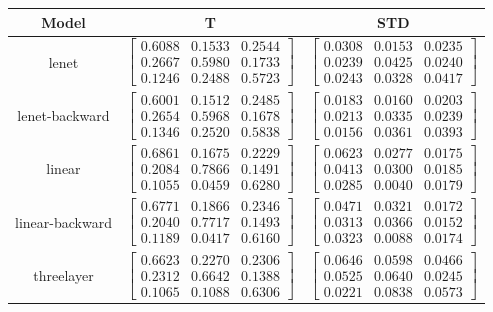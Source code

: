 \documentclass{article} %
\begin{document}
\begin{table}\begin{tabular}{ccc}Model&T&STD\\\hline
lenet & $\begin{bmatrix}0.6088 & 0.1533 & 0.2544\\0.2667 & 0.5980 & 0.1733\\0.1246 & 0.2488 & 0.5723\end{bmatrix}$ & $\begin{bmatrix}0.0308 & 0.0153 & 0.0235\\0.0239 & 0.0425 & 0.0240\\0.0243 & 0.0328 & 0.0417\end{bmatrix}$\\
lenet-backward & $\begin{bmatrix}0.6001 & 0.1512 & 0.2485\\0.2654 & 0.5968 & 0.1678\\0.1346 & 0.2520 & 0.5838\end{bmatrix}$ & $\begin{bmatrix}0.0183 & 0.0160 & 0.0203\\0.0213 & 0.0335 & 0.0239\\0.0156 & 0.0361 & 0.0393\end{bmatrix}$\\
linear & $\begin{bmatrix}0.6861 & 0.1675 & 0.2229\\0.2084 & 0.7866 & 0.1491\\0.1055 & 0.0459 & 0.6280\end{bmatrix}$ & $\begin{bmatrix}0.0623 & 0.0277 & 0.0175\\0.0413 & 0.0300 & 0.0185\\0.0285 & 0.0040 & 0.0179\end{bmatrix}$\\
linear-backward & $\begin{bmatrix}0.6771 & 0.1866 & 0.2346\\0.2040 & 0.7717 & 0.1493\\0.1189 & 0.0417 & 0.6160\end{bmatrix}$ & $\begin{bmatrix}0.0471 & 0.0321 & 0.0172\\0.0313 & 0.0366 & 0.0152\\0.0323 & 0.0088 & 0.0174\end{bmatrix}$\\
threelayer & $\begin{bmatrix}0.6623 & 0.2270 & 0.2306\\0.2312 & 0.6642 & 0.1388\\0.1065 & 0.1088 & 0.6306\end{bmatrix}$ & $\begin{bmatrix}0.0646 & 0.0598 & 0.0466\\0.0525 & 0.0640 & 0.0245\\0.0221 & 0.0838 & 0.0573\end{bmatrix}$\\

\end{tabular}
\end{table}
\end{document}
